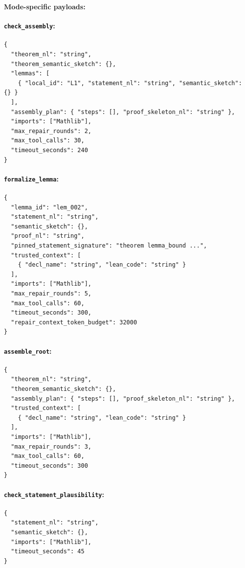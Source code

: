 \documentclass[11pt,a4paper]{article}
\begin{document}
\textbf{Mode-specific payloads:}

\paragraph{\texttt{check\_assembly}:}
\begin{lstlisting}
{
  "theorem_nl": "string",
  "theorem_semantic_sketch": {},
  "lemmas": [
    { "local_id": "L1", "statement_nl": "string", "semantic_sketch": {} }
  ],
  "assembly_plan": { "steps": [], "proof_skeleton_nl": "string" },
  "imports": ["Mathlib"],
  "max_repair_rounds": 2,
  "max_tool_calls": 30,
  "timeout_seconds": 240
}
\end{lstlisting}

\paragraph{\texttt{formalize\_lemma}:}
\begin{lstlisting}
{
  "lemma_id": "lem_002",
  "statement_nl": "string",
  "semantic_sketch": {},
  "proof_nl": "string",
  "pinned_statement_signature": "theorem lemma_bound ...",
  "trusted_context": [
    { "decl_name": "string", "lean_code": "string" }
  ],
  "imports": ["Mathlib"],
  "max_repair_rounds": 5,
  "max_tool_calls": 60,
  "timeout_seconds": 300,
  "repair_context_token_budget": 32000
}
\end{lstlisting}

\paragraph{\texttt{assemble\_root}:}
\begin{lstlisting}
{
  "theorem_nl": "string",
  "theorem_semantic_sketch": {},
  "assembly_plan": { "steps": [], "proof_skeleton_nl": "string" },
  "trusted_context": [
    { "decl_name": "string", "lean_code": "string" }
  ],
  "imports": ["Mathlib"],
  "max_repair_rounds": 3,
  "max_tool_calls": 60,
  "timeout_seconds": 300
}
\end{lstlisting}

\paragraph{\texttt{check\_statement\_plausibility}:}
\begin{lstlisting}
{
  "statement_nl": "string",
  "semantic_sketch": {},
  "imports": ["Mathlib"],
  "timeout_seconds": 45
}
\end{lstlisting}
\end{document}
